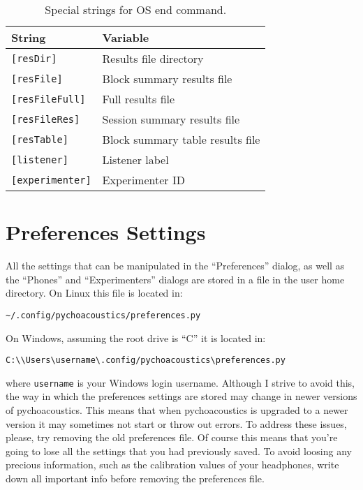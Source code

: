 \begin{table}[htbp]
\caption{Special strings for OS end command.} 
\begin{tabular}{ll}
\toprule

\textbf{String} & \textbf{Variable}  \\
\midrule
\verb+[resDir]+ & Results file directory \\
\verb+[resFile]+ & Block summary results file \\
\verb+[resFileFull]+ & Full results file \\
\verb+[resFileRes]+ & Session summary results file \\
\verb+[resTable]+ & Block summary table results file \\
\verb+[listener]+  & Listener label \\
\verb+[experimenter]+  & Experimenter ID \\

\bottomrule
\end{tabular}
\label{tab:end_cmd}
\end{table}

\section{Preferences Settings}
\label{sec:preferences}
All the settings that can be manipulated in the ``Preferences'' dialog, as 
well as the ``Phones'' and ``Experimenters'' dialogs are stored in a file 
in the user home directory. On Linux this file is located in:
\begin{verbatim}
~/.config/pychoacoustics/preferences.py
\end{verbatim}
On Windows, assuming the root drive is ``C'' it is located in:
\begin{verbatim}
C:\\Users\username\.config/pychoacoustics\preferences.py
\end{verbatim}
where \verb+username+ is your Windows login username.
Although I strive to avoid this, the way in which the preferences settings are stored 
may change in newer versions of pychoacoustics. This means that when pychoacoustics is 
upgraded to a newer version it may sometimes not start or throw out errors. To address 
these issues, please, try removing the old preferences file. Of course this means that 
you're going to lose all the settings that you had previously saved. To avoid loosing 
any precious information, such as the calibration values of your headphones, write down 
all important info before removing the preferences file.



